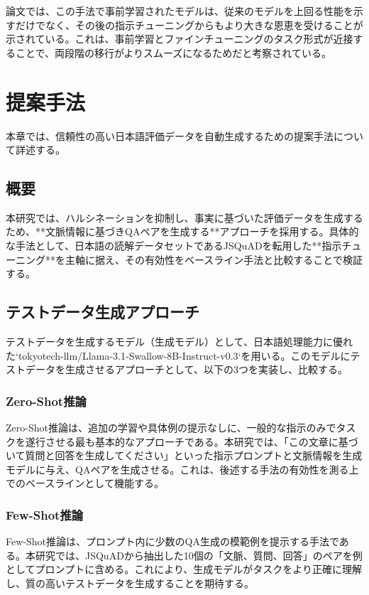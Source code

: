 \documentclass[a4paper,11pt]{jreport}
\begin{document}
論文では、この手法で事前学習されたモデルは、従来のモデルを上回る性能を示すだけでなく、その後の指示チューニングからもより大きな恩恵を受けることが示されている\cite{Instruction Pre-Training}。これは、事前学習とファインチューニングのタスク形式が近接することで、両段階の移行がよりスムーズになるためだと考察されている。










\chapter{提案手法}
本章では、信頼性の高い日本語評価データを自動生成するための提案手法について詳述する。

\section{概要}
本研究では、ハルシネーションを抑制し、事実に基づいた評価データを生成するため、**文脈情報に基づきQAペアを生成する**アプローチを採用する。具体的な手法として、日本語の読解データセットであるJSQuADを転用した**指示チューニング**を主軸に据え、その有効性をベースライン手法と比較することで検証する。

\section{テストデータ生成アプローチ}
テストデータを生成するモデル（生成モデル）として、日本語処理能力に優れた`tokyotech-llm/Llama-3.1-Swallow-8B-Instruct-v0.3`\cite{Fujii:COLM2024}を用いる。このモデルにテストデータを生成させるアプローチとして、以下の3つを実装し、比較する。

\subsection{Zero-Shot推論}
Zero-Shot推論は、追加の学習や具体例の提示なしに、一般的な指示のみでタスクを遂行させる最も基本的なアプローチである。本研究では、「この文章に基づいて質問と回答を生成してください」といった指示プロンプトと文脈情報を生成モデルに与え、QAペアを生成させる。これは、後述する手法の有効性を測る上でのベースラインとして機能する。

\subsection{Few-Shot推論}
Few-Shot推論は、プロンプト内に少数のQA生成の模範例を提示する手法である。本研究では、JSQuADから抽出した10個の「文脈、質問、回答」のペアを例としてプロンプトに含める。これにより、生成モデルがタスクをより正確に理解し、質の高いテストデータを生成することを期待する。
\end{document}
